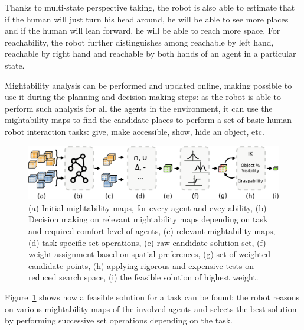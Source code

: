 \documentclass{svmult}
\begin{document}
Thanks to multi-state perspective taking, the robot is also able to estimate
that if the human will just turn his head around, he will be able to see more
places and if the human will lean forward, he will be able to reach more space.
For reachability, the robot further distinguishes among reachable by left hand,
reachable by right hand and reachable by both hands of an agent in a particular
state.  

Mightability analysis can be performed and updated online, making possible to
use it during the planning and decision making steps: as the robot is able to
perform such analysis for all the agents in the environment, it can use the
mightability maps to find the candidate places to perform a set of basic
human-robot interaction tasks: give, make accessible, show, hide an object,
etc. 

\begin{figure}
  \centering
  \includegraphics[width=\textwidth]{./figs/mightab-steps.pdf}

\caption {(a) Initial mightability maps, for every agent and evey ability, (b)
Decision making on relevant mightability maps depending on task and required
comfort level of agents, (c) relevant mightability maps, (d) task specific set
operations, (e) raw candidate solution set, (f) weight assignment based on
spatial preferences, (g) set of weighted candidate points, (h) applying
rigorous and expensive tests on reduced search space, (i) the feasible solution
of highest weight.}

  \label{fig|mightabilities-framework}
\end{figure}


Figure~\ref{fig|mightabilities-framework} shows how a feasible solution for a
task can be found: the robot reasons on various mightability maps of the involved agents and
selects the best solution by performing successive set operations depending on
the task.
\end{document}
